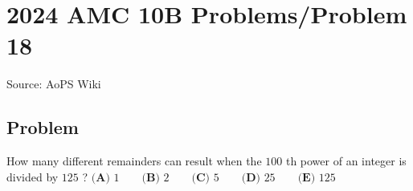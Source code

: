 \documentclass[12pt]{article}
\begin{document}
\section*{{2024 AMC 10B Problems/Problem 18}}
Source: AoPS Wiki

\subsection*{Problem}
How many different remainders can result when the $100$ th power of an integer is
divided by $125$ ? $\textbf{(A) } 1 \qquad\textbf{(B) } 2 \qquad\textbf{(C) } 5 \qquad\textbf{(D) } 25 \qquad\textbf{(E) } 125$
\end{document}
